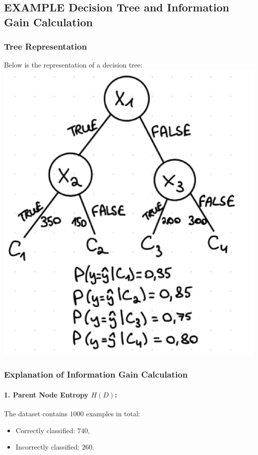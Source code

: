 \documentclass[10pt,a4paper]{article}
\begin{document}
\subsection*{EXAMPLE Decision Tree and Information Gain Calculation}

\subsubsection*{Tree Representation}
Below is the representation of a decision tree:
\includegraphics{Screenshot 2025-01-09 at 11.52.49.png}
\subsubsection*{Explanation of Information Gain Calculation}

\paragraph{1. Parent Node Entropy \(H(D)\):}
The dataset contains \(1000\) examples in total:
\begin{itemize}
    \item Correctly classified: \(740\),
    \item Incorrectly classified: \(260\).
\end{itemize}
\end{document}
